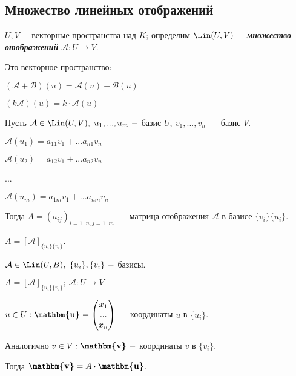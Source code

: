 \subsection{Множество линейных отображений}

\begin{definition}
    $U,V$ $-$ векторные пространства над $K$; определим $\Lin(U,V)$ $-$ 
\textbf{\textit{множество отображений}} $\mathcal{A}:U\rightarrow V$.

    Это векторное пространство: 
    
    $(\mathcal{A}+\mathcal{B})(u)=\mathcal{A}(u)+\mathcal{B}(u)$

    $(k\mathcal{A})(u)=k\cdot \mathcal{A}(u)$
\end{definition}

\begin{definition}
    Пусть $\mathcal{A}\in \Lin(U,V),\ u_1,...,u_m\ -$ базис $U,\ 
v_1,...,v_n\ -$ базис $V$.

    $\mathcal{A}(u_1)=a_{11}v_1+...a_{n1}v_n$

    $\mathcal{A}(u_2)=a_{12}v_1+...a_{n2}v_n$

    ...

    $\mathcal{A}(u_m)=a_{1m}v_1+...a_{nm}v_n$

    Тогда $A=(a_{ij})_{i=1..n, j=1..m}\ - $ матрица отображения 
$\mathcal{A}$ в базисе $\{v_i\}\{u_i\}$.
\end{definition}

\begin{designation}
    $A=[\mathcal{A}]_{\{u_i\}\{v_i\}}$.
\end{designation}

\begin{lemma}
    $\mathcal{A}\in \Lin (U, B),\ \{u_i\},\{v_i\}\ -$ базисы.
    
    $A=[\mathcal{A}]_{\{u_i\}\{v_i\}};\ \mathcal{A}:U\rightarrow V$ 

    $u\in U: \textbf{\mathbm{u}}=\begin{pmatrix}
        x_1 \\ ... \\ x_n
    \end{pmatrix}\ -$ координаты $u$ в $\{u_i\}$.

    Аналогично $v\in V: \textbf{\mathbm{v}}\ -$ координаты $v$ в 
$\{v_i\}$.

    Тогда $\textbf{\mathbm{v}}=A\cdot \textbf{\mathbm{u}}$.
    
\end{lemma}

